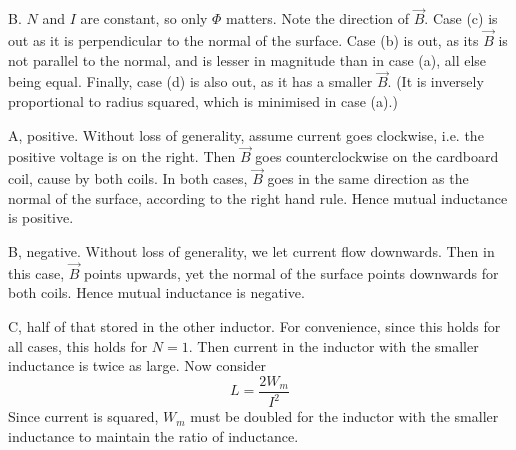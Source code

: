 \documentclass[answers]{exam}
\begin{document}
\begin{questions}
\begin{solution}
    B. $N$ and $I$ are constant, so only $\Phi$ matters. Note the direction of $\vec B$. Case (c) is out as it is perpendicular to the normal of the surface. Case (b) is out, as its $\vec B$ is not parallel to the normal, and is lesser in magnitude than in case (a), all else being equal. Finally, case (d) is also out, as it has a smaller $\vec B$. (It is inversely proportional to radius squared, which is minimised in case (a).)
\end{solution}


\begin{solution}
    A, positive. Without loss of generality, assume current goes clockwise, i.e. the positive voltage is on the right. Then $\vec B$ goes counterclockwise on the cardboard coil, cause by both coils. In both cases, $\vec B$ goes in the same direction as the normal of the surface, according to the right hand rule. Hence mutual inductance is positive.
\end{solution}


\begin{solution}
    B, negative. Without loss of generality, we let current flow downwards. Then in this case, $\vec B$ points upwards, yet the normal of the surface points downwards for both coils. Hence mutual inductance is negative.
\end{solution}


\begin{solution}
    C, half of that stored in the other inductor. For convenience, since this holds for all cases, this holds for $N=1$. Then current in the inductor with the smaller inductance is twice as large. Now consider
    $$L = \frac{2W_m}{I^2}$$
    Since current is squared, $W_m$ must be doubled for the inductor with the smaller inductance to maintain the ratio of inductance.
\end{solution}



\end{questions}
\end{document}
